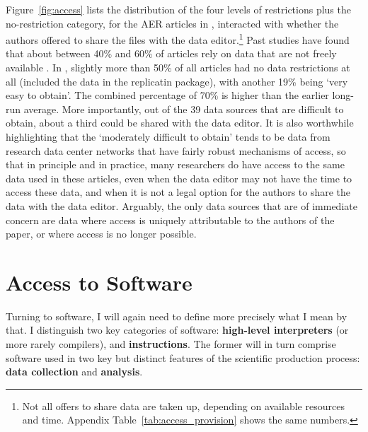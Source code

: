 \documentclass{article}
\begin{document}


Figure~\ref{fig:access} lists the distribution of the four levels of restrictions plus  the no-restriction category, for the \aerpapers{} AER articles in \aeryear{}, interacted with whether the authors offered to share the files with the data editor.\footnote{Not all offers to share data are taken up, depending on available resources and time. Appendix Table~\ref{tab:access_provision} shows the same numbers.}  
%
Past studies have found that about between 40\% and 60\% of articles rely on data that are not freely available \parencite{herbert_reproduce_2024,hamermesh_six_2013,chetty_time_2012}. 
In \aeryear{}, slightly more than 50\% of all articles had no data restrictions at all (included the data in the replicatin package), with another 19\% being `very easy to obtain'. The combined percentage of 70\% is higher than the earlier long-run average.  More importantly, out of the 39 data sources that are difficult to obtain, about a third could  be shared with the data editor. It is also worthwhile highlighting that the `moderately difficult to obtain' tends to be data from research data center networks that have fairly robust mechanisms of access, so that in principle and in practice, many researchers do have access to the same data used in these articles, even when the data editor may not have the time to access these data, and when it is not a legal option for the authors to share the data with the data editor. Arguably, the only data sources that are of immediate concern are data where access is uniquely attributable to the authors of the paper, or where access is no longer possible.










\section{Access to Software}
\label{sec:software}

Turning to software, I will again need to define more precisely what I mean by that. I distinguish two key categories of software: \textbf{high-level interpreters} (or more rarely compilers), and \textbf{instructions}. The former will in turn comprise software used in two key but distinct features of the scientific production process: \textbf{data collection} and \textbf{analysis}. 
\end{document}

